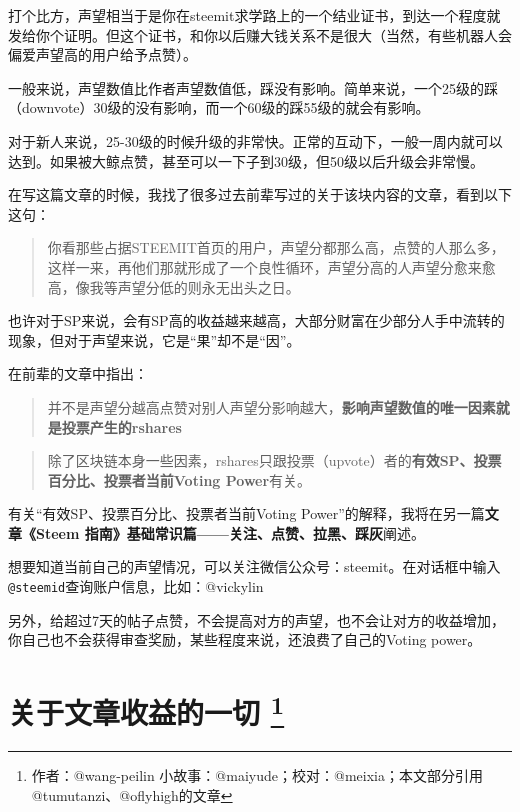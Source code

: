 \documentclass[]{ctexbook}
\begin{document}
打个比方，声望相当于是你在steemit求学路上的一个结业证书，到达一个程度就发给你个证明。但这个证书，和你以后赚大钱关系不是很大（当然，有些机器人会偏爱声望高的用户给予点赞）。

一般来说，声望数值比作者声望数值低，踩没有影响。简单来说，一个25级的踩（downvote）30级的没有影响，而一个60级的踩55级的就会有影响。

对于新人来说，25-30级的时候升级的非常快。正常的互动下，一般一周内就可以达到。如果被大鲸点赞，甚至可以一下子到30级，但50级以后升级会非常慢。

在写这篇文章的时候，我找了很多过去前辈写过的关于该块内容的文章，看到以下这句：

\begin{quote}
你看那些占据STEEMIT首页的用户，声望分都那么高，点赞的人那么多，这样一来，再他们那就形成了一个良性循环，声望分高的人声望分愈来愈高，像我等声望分低的则永无出头之日。
\end{quote}

也许对于SP来说，会有SP高的收益越来越高，大部分财富在少部分人手中流转的现象，但对于声望来说，它是``果''却不是``因''。

在前辈的文章中指出：

\begin{quote}
并不是声望分越高点赞对别人声望分影响越大，\textbf{影响声望数值的唯一因素就是投票产生的rshares}
\end{quote}

\begin{quote}
除了区块链本身一些因素，rshares只跟投票（upvote）者的\textbf{有效SP、投票百分比、投票者当前Voting Power}有关。
\end{quote}

有关``有效SP、投票百分比、投票者当前Voting Power''的解释，我将在另一篇\textbf{文章《Steem 指南》基础常识篇------关注、点赞、拉黑、踩灰}阐述。

想要知道当前自己的声望情况，可以关注微信公众号：steemit。在对话框中输入\texttt{@steemid}查询账户信息，比如：@vickylin

另外，给超过7天的帖子点赞，不会提高对方的声望，也不会让对方的收益增加，你自己也不会获得审查奖励，某些程度来说，还浪费了自己的Voting power。

\section[关于文章收益的一切 ]{\texorpdfstring{关于文章收益的一切 \footnote{作者：@wang-peilin 小故事：@maiyude；校对：@meixia；本文部分引用@tumutanzi、@oflyhigh的文章}}{关于文章收益的一切 }}
\end{document}
